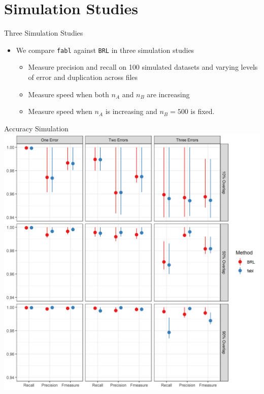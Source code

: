 \documentclass{beamer}
\begin{document}
\section{Simulation Studies}

\begin{frame}{Three Simulation Studies}
	\begin{itemize}
		\item We compare \texttt{fabl} against \texttt{BRL} in three simulation studies
		\begin{itemize}
			\item Measure precision and recall on 100 simulated datasets and varying levels of error and duplication across files
			\item Measure speed when both $n_A$ and $n_B$ are increasing
			\item Measure speed when $n_A$ is increasing and $n_B = 500$ is fixed. 
		\end{itemize}
	\end{itemize}
\end{frame}

	\begin{frame}{Accuracy Simulation}
	\includegraphics[width = \textwidth, height = .7\textwidth ]{../notes/figures/sadinle_sim_plot.png}
\end{frame}
\end{document}
